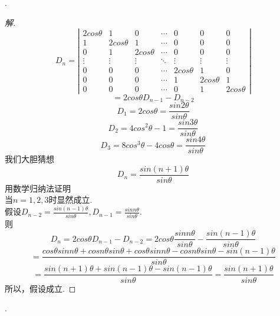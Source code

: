 \documentclass[10pt,a4paper]{report}
\begin{document}
.
\begin{proof}[解]
	$$D_{n} = \left|
	\begin{matrix}
	2cos\theta & 1 & 0 & \cdots & 0 & 0 & 0\\
	1 & 2cos\theta & 1 & \cdots & 0 & 0 & 0\\
	0 & 1 & 2cos\theta & \cdots & 0 & 0 & 0\\
	\vdots & \vdots & \vdots & \ddots & \vdots & \vdots & \vdots \\
	0 & 0 & 0 & \cdots & 2cos\theta & 1 & 0 \\
	0 & 0 & 0 & \cdots & 1 & 2cos\theta & 1\\
	0 & 0 & 0 & \cdots & 0 & 1 & 2cos\theta
	\end{matrix}
	\right|$$
	$$
	= 2cos\theta D_{n-1}-D_{n-2}
	$$
	$$
	D_{1} = 2cos\theta = \frac{sin2\theta}{sin\theta}
	$$
	$$
	D_{2} = 4cos^{2}\theta-1 = \frac{sin3\theta}{sin\theta}
	$$
	$$
	D_{3} = 8cos^{3}\theta-4cos\theta = \frac{sin4\theta}{sin\theta}
	$$
	我们大胆猜想\\
	$$
	D_{n} = \frac{sin(n+1)\theta}{sin\theta}
	$$
	用数学归纳法证明\\
	当$n = 1, 2, 3$时显然成立.\\
	假设$D_{n-2} = \frac{sin(n-1)\theta}{sin\theta}, D_{n-1} = \frac{sinn\theta}{sin\theta}$.\\
	则
	$$
	D_{n} = 2cos\theta D_{n-1}-D_{n-2} = 2cos\theta \frac{sinn\theta}{sin\theta}-\frac{sin(n-1)\theta}{sin\theta}
	$$
	$$
	= \frac{cos\theta sinn\theta + cosn\theta sin\theta + cos\theta sinn\theta - cosn\theta sin\theta - sin(n-1)\theta}{sin\theta}
	$$
	$$
	= \frac{sin(n+1)\theta+sin(n-1)\theta-sin(n-1)\theta}{sin\theta} = \frac{sin(n+1)\theta}{sin\theta}
	$$
	所以，假设成立.
\end{proof}
.
\end{document}
